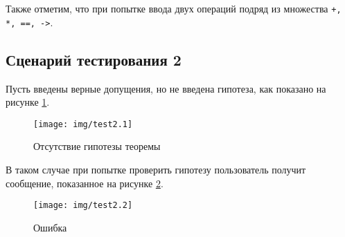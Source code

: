 \documentclass[12pt, a4paper]{article}
\begin{document}
	 \par Также отметим, что при попытке ввода двух операций подряд из множества \texttt{+, *, ==, ->}.
	  \begin{center}
	 	\subsection{Сценарий тестирования 2}
	 \end{center} 
	 \par Пусть введены верные допущения, но не введена гипотеза, как показано на рисунке \ref{fig:test2.1}.
	 \begin{figure}[h!]
	 	\centering
	 	\texttt{[image: img/test2.1]}
	 	\caption{Отсутствие гипотезы теоремы}
	 	\label{fig:test2.1}
	 \end{figure}
	 
	 В таком случае при попытке проверить гипотезу пользователь получит  сообщение, показанное на рисунке  \ref{fig:test2.2}.
	 \begin{figure}[h!]
	 	\centering
	 	\texttt{[image: img/test2.2]}
	 	\caption{Ошибка}
	 	\label{fig:test2.2}
	 \end{figure}
	 \newpage
	 
\end{document}
